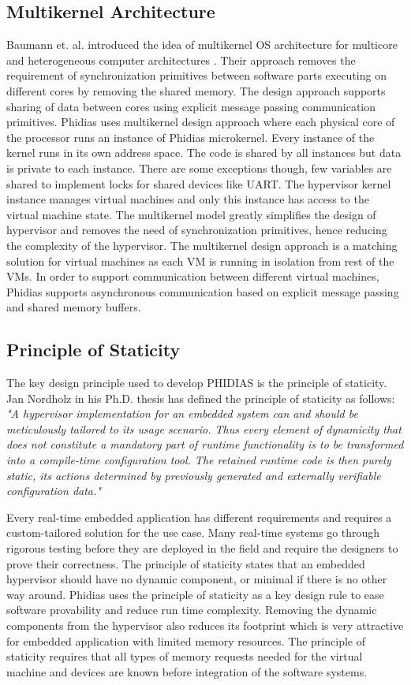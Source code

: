 \subsection{Multikernel Architecture}
Baumann et. al. introduced the idea of multikernel OS architecture for multicore and heterogeneous computer architectures \cite{baumann2009multikernel}. 
Their approach removes the requirement of synchronization primitives between software parts executing on different cores by removing the shared memory.
The design approach supports sharing of data between cores using explicit message passing communication primitives.
Phidias uses multikernel design approach where each physical core of the processor runs an instance of Phidias microkernel.
Every instance of the kernel runs in its own address space.
The code is shared by all instances but data is private to each instance.
There are some exceptions though, few variables are shared to implement locks for shared devices like UART.
The hypervisor kernel instance manages virtual machines and only this instance has access to the virtual machine state.
The multikernel model greatly simplifies the design of hypervisor and removes the need of synchronization primitives, 
hence reducing the complexity of the hypervisor.
The multikernel design approach is a matching solution for virtual machines as each VM is running in isolation from rest of the VMs.
In order to support communication between different virtual machines, Phidias supports 
asynchronous communication based on explicit message passing and shared memory buffers.

\subsection{Principle of Staticity}
The key design principle used to develop PHIDIAS is the principle of staticity.
Jan Nordholz in his Ph.D. thesis \cite{nordholz2017design} has defined the principle of staticity as follows:
\emph {"A hypervisor implementation for an embedded system can
and should be meticulously tailored to its usage scenario. Thus
every element of dynamicity that does not constitute a mandatory
part of runtime functionality is to be transformed into a
compile-time configuration tool. The retained runtime code is
then purely static, its actions determined by previously generated and externally verifiable configuration data."}

Every real-time embedded application has different requirements and requires a custom-tailored solution for the use case. 
Many real-time systems go through rigorous testing before they are deployed in the field and require the designers to prove their correctness.
The principle of staticity states that an embedded hypervisor should have no dynamic component, or minimal if there is no other way around.
Phidias uses the principle of staticity as a key design rule to ease software provability and reduce run time complexity. 
Removing the dynamic components from the hypervisor also reduces its footprint which is very attractive for embedded application with limited
memory resources.
The principle of staticity requires that all types of memory requests needed for the virtual machine and devices are known 
before integration of the software systems.

